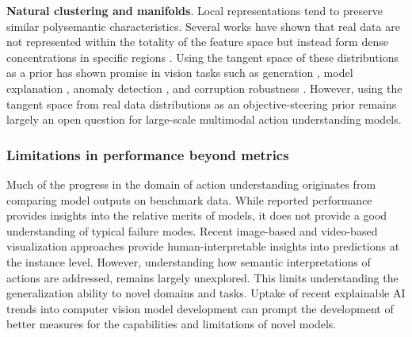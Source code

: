 \noindent
\textbf{Natural clustering and manifolds}. Local representations tend to preserve similar polysemantic characteristics. Several works have shown that real data are not represented within the totality of the feature space but instead form dense concentrations in specific regions . Using the tangent space of these distributions as a prior has shown promise in vision tasks such as generation , model explanation , anomaly detection , and corruption robustness . However, using the tangent space from real data distributions as an objective-steering prior remains largely an open question for large-scale multimodal action understanding models. 


\subsubsection{Limitations in performance beyond metrics} \label{sec:directions:tasks:metrics}

Much of the progress in the domain of action understanding originates from comparing model outputs on benchmark data. While reported performance provides insights into the relative merits of models, it does not provide a good understanding of typical failure modes. Recent image-based  and video-based  visualization approaches provide human-interpretable insights into predictions at the instance level. However, understanding how semantic interpretations of actions are addressed, remains largely unexplored. This limits understanding the generalization ability to novel domains and tasks. Uptake of recent explainable AI trends  into computer vision model development can prompt the development of better measures for the capabilities and limitations of novel models.

